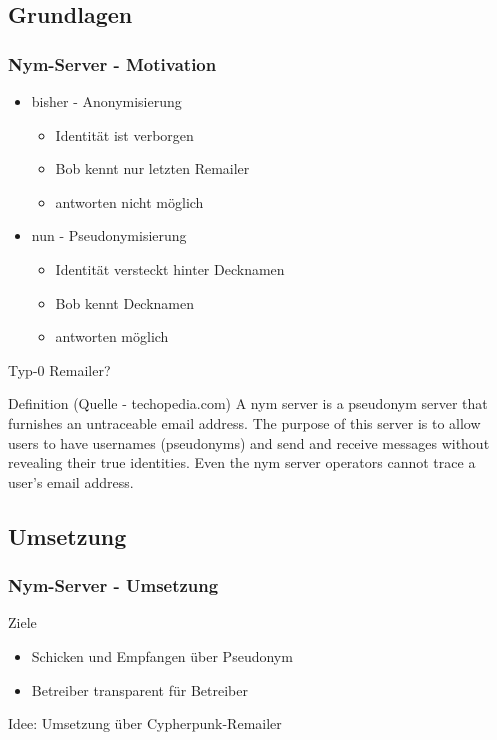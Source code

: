 \documentclass{beamer}
\begin{document}
\subsection{Grundlagen}
\begin{frame}
	\frametitle{Nym-Server - Motivation}
	\begin{itemize}
		\item bisher - Anonymisierung
		\begin{itemize}	
			\item Identität ist verborgen
			\item Bob kennt nur letzten Remailer
			\item antworten nicht möglich
		\end{itemize}
		\pause
		\item nun - Pseudonymisierung
		\begin{itemize}	
			\item Identität versteckt hinter Decknamen
			\item Bob kennt Decknamen
			\item antworten möglich
		\end{itemize}
	\end{itemize}

	\pause
	Typ-0 Remailer?
	\pause

	\begin{block}{Definition (Quelle - techopedia.com)}
		A nym server is a pseudonym server that furnishes an untraceable email address. The purpose of this server is to allow users to have usernames (pseudonyms) and send and 			receive messages without revealing their true identities.
		Even the nym server operators cannot trace a user's email address.
	\end{block}
\end{frame}

\subsection{Umsetzung}
\begin{frame}
	\frametitle{Nym-Server - Umsetzung}

	\begin{block}{Ziele}
		\begin{itemize}
			\item Schicken und Empfangen über Pseudonym
			\item Betreiber transparent für Betreiber
		\end{itemize}
	\end{block}

	\pause

	Idee: Umsetzung über Cypherpunk-Remailer
	
\end{frame}
\end{document}
